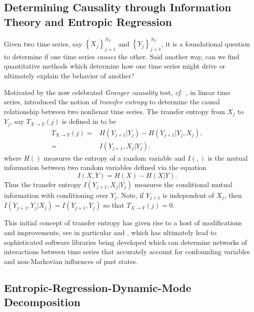 \documentclass[a4paper,11pt]{article}
\newcommand{\cf}{{\it cf.}~}
\begin{document}
\subsection{Determining Causality through Information Theory and Entropic Regression}

Given two time series, say $\left\{X_{j}\right\}_{j=1}^{N_{T}}$ and $\left\{Y_{j}\right\}_{j=1}^{N_{T}}$, it is a foundational question to determine if one time series {\it causes} the other.  Said another way, can we find quantitative methods which determine how one time series might drive or ultimately explain the behavior of another?  

Motivated by the now celebrated {\it Granger causality} test, \cf \cite{granger}, in linear time series, \cite{schreiber} introduced the notion of {\it transfer entropy} to determine the causal relationship between two nonlienar time series.  The transfer entropy from $X_{j}$ to $Y_{j}$, say $T_{X\rightarrow Y}(j)$ is defined in \cite{schreiber} to be 
\begin{align}
T_{X\rightarrow Y}(j) = & H\left(Y_{j+1}|Y_{j}\right) - H\left(Y_{j+1}|Y_{j}, X_{j}\right),  \\
= & I\left(Y_{j+1}, X_{j}|Y_{j} \right).
\end{align}
where $H()$ measures the entropy of a random variable and $I(,)$ is the mutual information between two random variables defined via the equation
\begin{equation}
I(X,Y) = H(X) - H(X|Y).  
\end{equation}
Thus the transfer entropy $I(Y_{j+1},X_{j}|Y_{j})$ measures the conditional mutual information with conditioning over $Y_{j}$.  Note, if $Y_{j+1}$ is independent of $X_{j}$, then $I(Y_{j+1},Y_{j}|X_{j}) = I(Y_{j+1},Y_{j})$ so that $T_{X\rightarrow Y}(j) = 0$.  

This initial concept of transfer entropy has given rise to a host of modifications and improvements, see in particular \cite{faes} and \cite{bollt}, which has ultimately lead to sophisticated software libraries being developed which can determine networks of interactions between time series that accurately account for confounding variables and non-Markovian influences of past states.  

\subsection{Entropic-Regression-Dynamic-Mode Decomposition}
\end{document}
